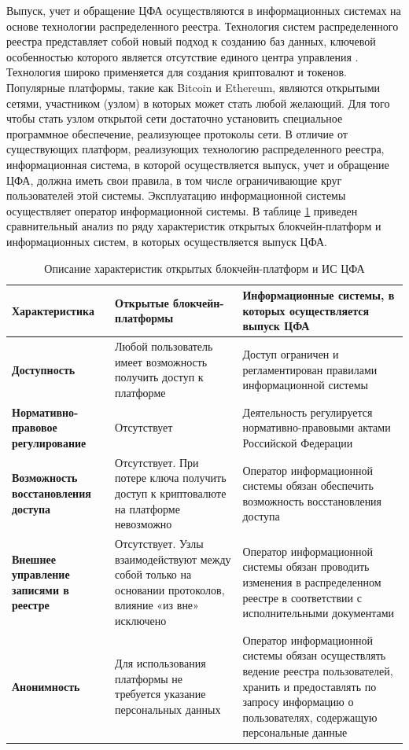 \documentclass[a4paper, 10pt]{article}
\begin{document}
	Выпуск, учет и обращение ЦФА осуществляются в информационных системах на основе технологии распределенного реестра. Технология систем распределенного реестра представляет собой новый подход к созданию баз данных, ключевой особенностью которого является отсутствие единого центра управления \cite{ru:roadmap}. Технология широко применяется для создания криптовалют и токенов. Популярные платформы, такие как Bitcoin и Ethereum, являются открытыми сетями, участником (узлом) в которых может стать любой желающий. Для того чтобы стать узлом открытой сети достаточно установить специальное программное обеспечение, реализующее протоколы сети. В отличие от существующих платформ, реализующих технологию распределенного реестра, информационная система, в которой осуществляется выпуск, учет и обращение ЦФА, должна иметь свои правила, в том числе ограничивающие круг пользователей этой системы. Эксплуатацию информационной системы осуществляет оператор информационной системы. В таблице \ref{table:characteristics} приведен сравнительный анализ по ряду характеристик открытых блокчейн-платформ и информационных систем, в которых осуществляется выпуск ЦФА.
	
	\begin{longtable}{|p{3.5cm}|p{6.1cm}|p{6.2cm}|}
		\caption{Описание характеристик открытых блокчейн-платформ и ИС ЦФА}
		\label{table:characteristics}\\
		\hline
		
		\textbf{Характеристика} 
		& \textbf{Открытые блокчейн-платформы} 
		& \textbf{Информационные системы, в которых осуществляется выпуск ЦФА}\\
		\hline
		
		\textbf{Доступность}
		& Любой пользователь имеет возможность получить доступ к платформе
		& Доступ ограничен и регламентирован правилами информационной системы\\
		\hline
		
		\textbf{Нормативно-правовое регулирование}
		& Отсутствует
		& Деятельность регулируется нормативно-правовыми актами Российской Федерации\\
		\hline
		
		\textbf{Возможность восстановления доступа}
		& Отсутствует. При потере ключа получить доступ к криптовалюте на платформе невозможно
		& Оператор информационной системы обязан обеспечить возможность восстановления доступа\\
		\hline
		
		\textbf{Внешнее управление записями в реестре}
		& Отсутствует. Узлы взаимодействуют между собой только на основании протоколов, влияние «из вне» исключено
		& Оператор информационной системы обязан проводить изменения в распределенном реестре в соответствии с исполнительными документами\\
		\hline
		
		\textbf{Анонимность}
		& Для использования платформы не требуется указание персональных данных
		& Оператор информационной системы обязан осуществлять ведение реестра пользователей, хранить и предоставлять по запросу информацию о пользователях, содержащую персональные данные \cite{ru:cb}\\
		\hline
	\end{longtable}
	
\end{document}
